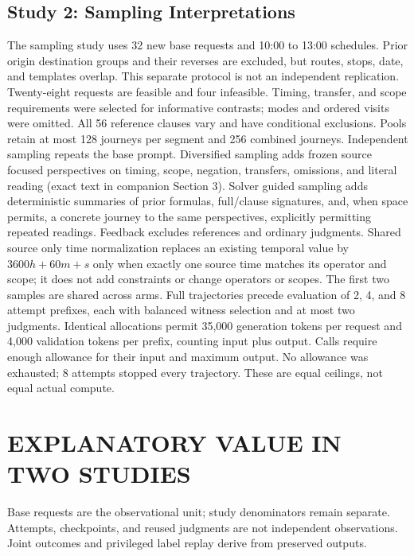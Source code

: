 \documentclass[a4paper,twoside]{article}
\begin{document}
\subsection{Study 2: Sampling Interpretations}

The sampling study uses 32 new base requests and 10:00 to 13:00 schedules. Prior origin destination groups and their reverses are excluded, but routes, stops, date, and templates overlap. This separate protocol is not an independent replication. Twenty-eight requests are feasible and four infeasible. Timing, transfer, and scope requirements were selected for informative contrasts; modes and ordered visits were omitted. All 56 reference clauses vary and have conditional exclusions. Pools retain at most 128 journeys per segment and 256 combined journeys.
Independent sampling repeats the base prompt. Diversified sampling adds frozen source focused perspectives on timing, scope, negation, transfers, omissions, and literal reading (exact text in companion Section 3). Solver guided sampling adds deterministic summaries of prior formulas, full/clause signatures, and, when space permits, a concrete journey to the same perspectives, explicitly permitting repeated readings. Feedback excludes references and ordinary judgments. Shared source only time normalization replaces an existing temporal value by $3600h+60m+s$ only when exactly one source time matches its operator and scope; it does not add constraints or change operators or scopes.
The first two samples are shared across arms. Full trajectories precede evaluation of 2, 4, and 8 attempt prefixes, each with balanced witness selection and at most two judgments. Identical allocations permit 35,000 generation tokens per request and 4,000 validation tokens per prefix, counting input plus output. Calls require enough allowance for their input and maximum output. No allowance was exhausted; 8 attempts stopped every trajectory. These are equal ceilings, not equal actual compute.



\section{\uppercase{Explanatory Value in Two Studies}}
\label{sec:findings}

\noindent Base requests are the observational unit; study denominators remain separate. Attempts, checkpoints, and reused judgments are not independent observations. Joint outcomes and privileged label replay derive from preserved outputs.
\end{document}
